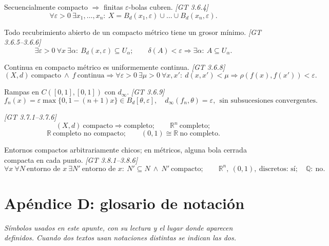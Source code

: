 \documentclass[11pt,a4paper]{article}
\theoremstyle{definition}
\theoremstyle{plain}
\newcommand{\fnt}[1]{{\normalfont\small\itshape\color{gray!150!black}[#1]}}
\newcommand{\R}{\mathbb{R}}
\newcommand{\Q}{\mathbb{Q}}
\newcommand{\Bola}[2]{B_d(#1,#2)}
\newcommand{\Bolac}[2]{B_d[#1,#2]}
\begin{document}
\begin{itemize}[leftmargin=1.3em,itemsep=3pt]
 Secuencialmente compacto $\Rightarrow$ finitas $\varepsilon$-bolas cubren. \fnt{GT 3.6.4}
\[ \forall\varepsilon>0\ \exists x_1,\dots,x_n:\ X=\Bola{x_1}{\varepsilon}\cup\dots\cup\Bola{x_n}{\varepsilon}. \]

 Todo recubrimiento abierto de un compacto métrico tiene un grosor mínimo. \fnt{GT 3.6.5--3.6.6}
\[ \exists\varepsilon>0\ \forall x\ \exists\alpha:\ \Bola{x}{\varepsilon}\subseteq U_\alpha;\qquad \delta(A)<\varepsilon\Rightarrow\exists\alpha:\ A\subseteq U_\alpha. \]

 Continua en compacto métrico es uniformemente continua. \fnt{GT 3.6.8}
\[ (X,d)\ \text{compacto}\ \wedge\ f\ \text{continua}\Rightarrow\forall\varepsilon>0\ \exists\mu>0\ \forall x,x':\ d(x,x')<\mu\Rightarrow\rho(f(x),f(x'))<\varepsilon. \]

 Rampas en $C([0,1],[0,1])$ con $d_\infty$. \fnt{GT 3.6.9}
\[ f_n(x)=\varepsilon\max\{0,1-(n+1)x\}\in\Bolac{\theta}{\varepsilon},\quad d_\infty(f_n,\theta)=\varepsilon,\ \ \text{sin subsucesiones convergentes}. \]

 \fnt{GT 3.7.1--3.7.6}
\[ (X,d)\ \text{compacto}\Rightarrow\text{completo};\qquad \R^n\ \text{completo};\]
\[ \R\ \text{completo no compacto};\qquad (0,1)\cong\R\ \text{no completo}. \]

 Entornos compactos arbitrariamente chicos; en métricos, alguna bola cerrada compacta en cada punto. \fnt{GT 3.8.1--3.8.6}
\[ \forall x\ \forall N\ \text{entorno de } x\ \exists N'\ \text{entorno de } x:\ N'\subseteq N\ \wedge\ N'\ \text{compacto};\qquad \R^n,\ (0,1),\ \text{discretos: sí};\quad \Q:\ \text{no}. \]

\end{itemize}

\clearpage
\section*{Apéndice D: glosario de notación}

\noindent\emph{Símbolos usados en este apunte, con su lectura y el lugar donde aparecen definidos. Cuando dos textos usan notaciones distintas se indican las dos.}

\newcommand{\gl}[2]{#1 & #2 \\[1.5pt]}
\newcommand{\gltit}[1]{\multicolumn{2}{@{}l@{}}{\vspace{2pt}\textbf{#1}}\\[2pt]}
\end{document}
